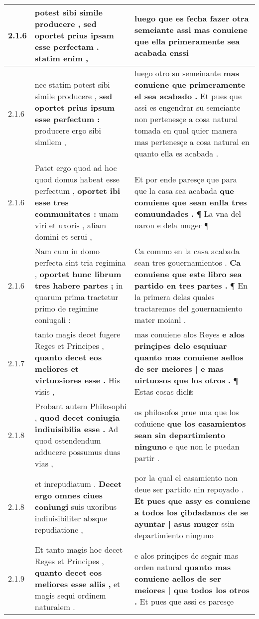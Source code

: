 \begin{tabular}{|p{1cm}|p{6.5cm}|p{6.5cm}|}
2.1.6 & potest sibi simile producere , \textbf{ sed oportet prius ipsam esse perfectam . } statim enim , & luego que es fecha fazer otra semeiante \textbf{ assi mas conuiene que ella primeramente sea acabada } enssi \\\hline
2.1.6 & nec statim potest sibi simile producere , \textbf{ sed oportet prius ipsum esse perfectum : } producere ergo sibi similem , & luego otro su semeinante \textbf{ mas conuiene que primeramente el sea acabado . } Et pues que assi es engendrar su semeiante non pertenesçe a cosa natural tomada en qual quier manera mas pertenesçe a cosa natural en quanto ella es acabada . \\\hline
2.1.6 & Patet ergo quod ad hoc quod domus habeat esse perfectum , \textbf{ oportet ibi esse tres communitates : } unam viri et uxoris , aliam domini et serui , & Et por ende paresçe que para que la casa sea acabada \textbf{ que conuiene que sean enlla tres comuundades . } ¶ La vna del uaron e dela muger ¶ \\\hline
2.1.6 & Nam cum in domo perfecta sint tria regimina , \textbf{ oportet hunc librum tres habere partes ; } in quarum prima tractetur primo de regimine coniugali : & Ca commo en la casa acabada sean tres gouernamientos . \textbf{ Ca conuiene que este libro sea partido en tres partes . } ¶ En la primera delas quales tractaremos del gouernamiento mater moianl . \\\hline
2.1.7 & tanto magis decet fugere Reges et Principes , \textbf{ quanto decet eos meliores et virtuosiores esse . } His visis , & mas conuiene alos Reyes \textbf{ e alos prinçipes delo esquiuar quanto mas conuiene aellos de ser meiores | e mas uirtuosos que los otros . } ¶ Estas cosas dichͣs \\\hline
2.1.8 & Probant autem Philosophi , \textbf{ quod decet coniugia indiuisibilia esse . } Ad quod ostendendum adducere possumus duas vias , & os philosofos prue una que los con̊uiene \textbf{ que los casamientos sean sin departimiento ninguno } e que non le puedan partir . \\\hline
2.1.8 & et inrepudiatum . \textbf{ Decet ergo omnes ciues coniungi } suis uxoribus indiuisibiliter absque repudiatione , & por la qual el casamiento non deue ser partido nin repoyado . \textbf{ Et pues que assy es conuiene a todos los çibdadanos de se ayuntar | asus muger } ssin departimiento ninguno \\\hline
2.1.9 & Et tanto magis hoc decet Reges et Principes , \textbf{ quanto decet eos meliores esse aliis , } et magis sequi ordinem naturalem . & e alos prinçipes de segnir mas orden natural \textbf{ quanto mas conuiene aellos de ser meiores | que todos los otros . } Et pues que assi es paresçe \\\hline

\end{tabular}
